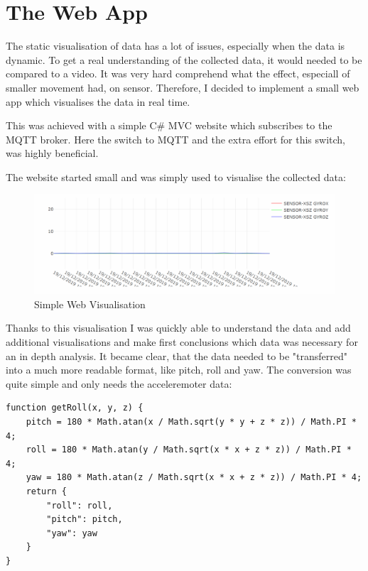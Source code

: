 \section{The Web App}

The static visualisation of data has a lot of issues, especially when the data is dynamic. To get a real understanding of the collected data, it would needed to be compared to a video. It was very hard comprehend what the effect, especiall of smaller movement had, on sensor. Therefore, I decided to implement a small web app which visualises the data in real time. 

This was achieved with a simple C\# \gls{MVC} website which subscribes to the MQTT broker. Here the switch to MQTT and the extra effort for this switch, was highly beneficial.

The website started small and was simply used to visualise the collected data:
\begin{figure}[h]
  \begin{center}
\includegraphics[width=\linewidth]{images/WebVisualisation_SIMPLE.png}
  \end{center}
  \caption{Simple Web Visualisation}
  \label{fig:SimpleWebVisualisation}
\end{figure}

Thanks to this visualisation I was quickly able to understand the data and add additional visualisations and make first conclusions which data was necessary for an in depth analysis. It became clear, that the data needed to be "transferred" into a much more readable format, like pitch, roll and yaw. 
The conversion was quite simple and only needs the acceleremoter data:

\begin{lstlisting}
function getRoll(x, y, z) {
    pitch = 180 * Math.atan(x / Math.sqrt(y * y + z * z)) / Math.PI * 4;
    roll = 180 * Math.atan(y / Math.sqrt(x * x + z * z)) / Math.PI * 4;
    yaw = 180 * Math.atan(z / Math.sqrt(x * x + z * z)) / Math.PI * 4;
    return {
        "roll": roll,
        "pitch": pitch,
        "yaw": yaw
    }
}
\end{lstlisting}
\cite{Beginner65:online}


